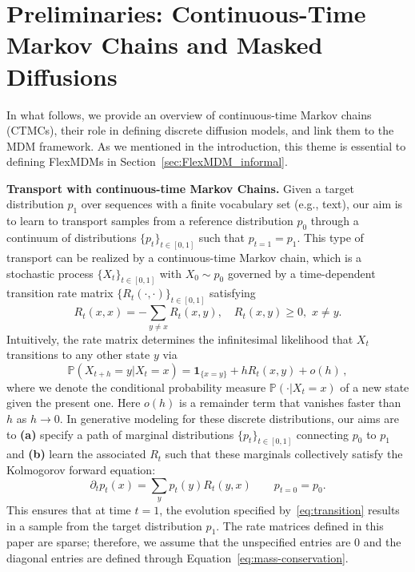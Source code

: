\section{Preliminaries: Continuous-Time Markov Chains and Masked Diffusions}
\label{sec:pre}
In what follows, we provide an overview of continuous-time Markov chains (CTMCs), their role in defining discrete diffusion models, and link them to the MDM framework. As we mentioned in the introduction, this theme is essential to defining FlexMDMs in Section~\ref{sec:FlexMDM_informal}.

\textbf{Transport with continuous-time Markov Chains.} Given a target distribution $p_1$ over sequences with a finite vocabulary set (e.g., text), our aim is to learn to transport samples from a reference distribution $p_0$ through a continuum of distributions $\{p_t\}_{t \in [0,1]}$ such that $p_{t=1} = p_1$. This type of transport can be realized by a continuous-time Markov chain, which is a stochastic process $\{X_t\}_{t\in[0,1]}$ with $X_0 \sim p_0$ governed by a time-dependent transition rate matrix  $\{R_t(\cdot,\cdot)\}_{t\in[0,1]}$ satisfying
\begin{equation} \label{eq:mass-conservation}
    R_t(x, x)= -\sum_{y \neq x} R_t(x, y), \quad R_t(x,y) \ge 0,\,\, x \ne y.
\end{equation}
Intuitively, the rate matrix determines the infinitesimal likelihood that $X_t$ transitions to any other state $y$ via 
%
\begin{equation} \label{eq:transition}
    \mathbb P(X_{t+h} = y | X_t = x) = \mathbf{1}_{\{x = y\}} + h R_t(x,y) + o(h)\,,
\end{equation}
%
where we denote the conditional probability measure $\mathbb P(\cdot |X_{t} = x)$ of a new state given the present one. Here $o(h)$ is a remainder term that vanishes faster than $h$ as $h\rightarrow 0$. 
In generative modeling for these discrete distributions, our aims are to \textbf{(a)} specify a path of marginal distributions $\{p_t\}_{t\in[0,1]}$ connecting $p_0$ to $p_1$ and \textbf{(b)} learn the associated $R_t$ such that these marginals collectively satisfy the Kolmogorov forward equation:
%
\begin{equation} \label{eq:kfe}
\partial_t p_t(x) = \sum_y p_t(y) R_t(y, x)  \qquad p_{t=0} = p_0.
\end{equation}
%
This ensures that at time $t = 1$, the evolution specified by~\eqref{eq:transition} results in a sample from the target distribution $p_1$. The rate matrices defined in this paper are sparse; therefore, we assume that the unspecified entries are $0$ and the diagonal entries are defined through Equation~\eqref{eq:mass-conservation}.
